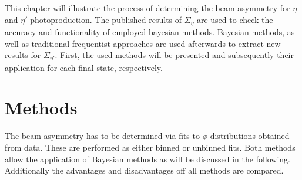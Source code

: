 This chapter will illustrate the process of determining the beam asymmetry for $\eta$ and $\eta'$ photoproduction. The published results of $\Sigma_{\eta}$ \cite{farahphd,eta} are used to check the accuracy and functionality of employed bayesian methods. Bayesian methods, as well as traditional frequentist approaches are used afterwards to extract new results for $\Sigma_{\eta'}$. First, the used methods will be presented and subsequently their application for each final state, respectively.
\section{Methods}
\label{sec:meth}
The beam asymmetry has to be determined via fits to $\phi$ distributions obtained from data. These are performed as either binned or unbinned fits. Both methods allow the application of Bayesian methods as will be discussed in the following. Additionally the advantages and disadvantages off all methods are compared.
